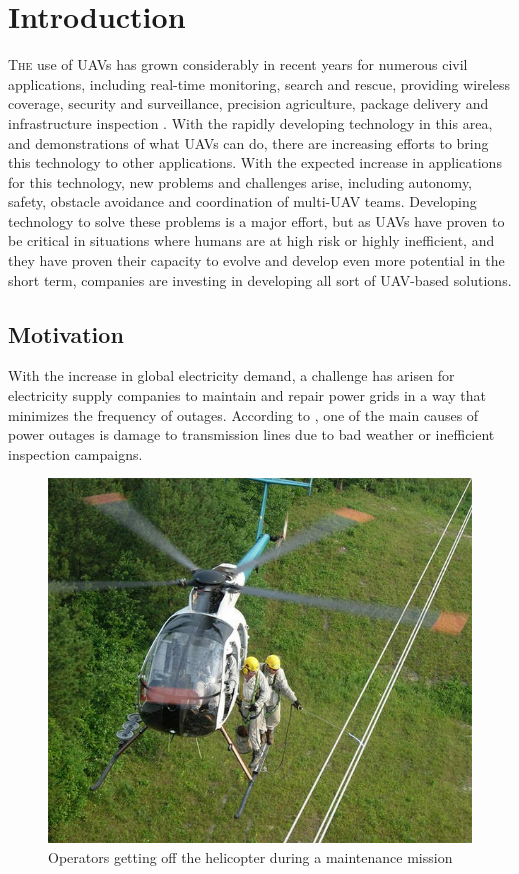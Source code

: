 \chapter{Introduction}
\label{ch:Introduction}
\lettrine[lraise=-0.1, lines=2, loversize=0.2]{T}{he} use of \glspl{UAV} has grown considerably in recent years for numerous civil applications, including real-time monitoring, search and rescue, providing wireless coverage, security and surveillance, precision agriculture, package delivery and infrastructure inspection \cite{CivilAplications}. With the rapidly developing technology in this area, and demonstrations of what \glspl{UAV} can do, there are increasing efforts to bring this technology to other applications. With the expected increase in applications for this technology, new problems and challenges arise, including autonomy, safety, obstacle avoidance and coordination of multi-\gls{UAV} teams. Developing technology to solve these problems is a major effort, but as \glspl{UAV} have proven to be critical in situations where humans are at high risk or highly inefficient, and they have proven their capacity to evolve and develop even more potential in the short term, companies are investing in developing all sort of \gls{UAV}-based solutions.

\section{Motivation}
\label{sec:Motivation}
With the increase in global electricity demand, a challenge has arisen for electricity supply companies to maintain and repair power grids in a way that minimizes the frequency of outages. According to \cite{PowerOutagesCauses}, one of the main causes of power outages is damage to transmission lines due to bad weather or inefficient inspection campaigns.

\begin{figure}[htbp]
    \centering
    \includegraphics[width=0.6\linewidth]
    {Introduction/figures/helicopter.jpg}
    \caption{Operators getting off the helicopter during a maintenance mission}
    \label{fig:helicopter}
\end{figure}

